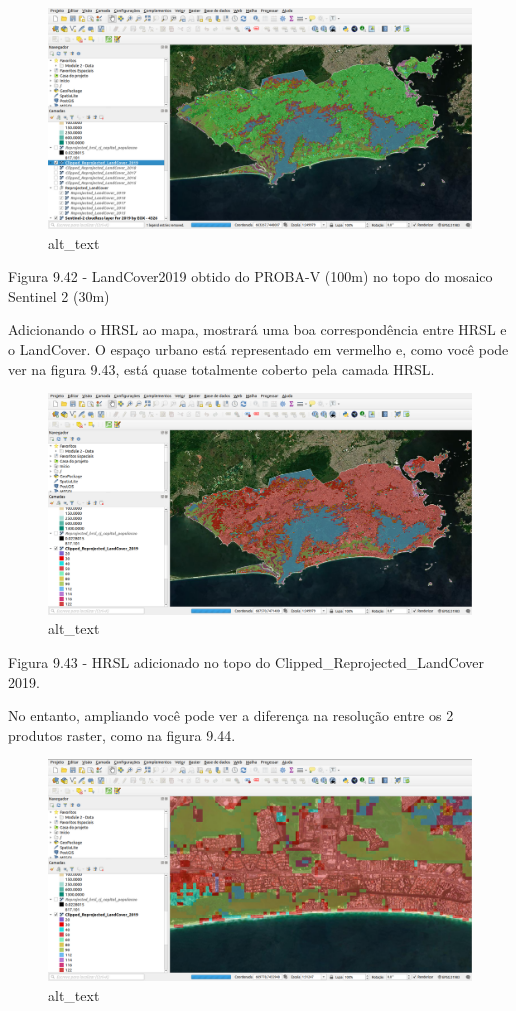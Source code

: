 \documentclass[
]{book}
\begin{document}
\begin{figure}
\centering
\includegraphics{media/modulo9/fig942.png}
\caption{alt\_text}
\end{figure}

Figura 9.42 - LandCover2019 obtido do PROBA-V (100m) no topo do mosaico Sentinel 2 (30m)

Adicionando o HRSL ao mapa, mostrará uma boa correspondência entre HRSL e o LandCover. O espaço urbano está representado em vermelho e, como você pode ver na figura 9.43, está quase totalmente coberto pela camada HRSL.

\begin{figure}
\centering
\includegraphics{media/modulo9/fig943.png}
\caption{alt\_text}
\end{figure}

Figura 9.43 - HRSL adicionado no topo do Clipped\_Reprojected\_LandCover 2019.

No entanto, ampliando você pode ver a diferença na resolução entre os 2 produtos raster, como na figura 9.44.

\begin{figure}
\centering
\includegraphics{media/modulo9/fig944.png}
\caption{alt\_text}
\end{figure}
\end{document}
